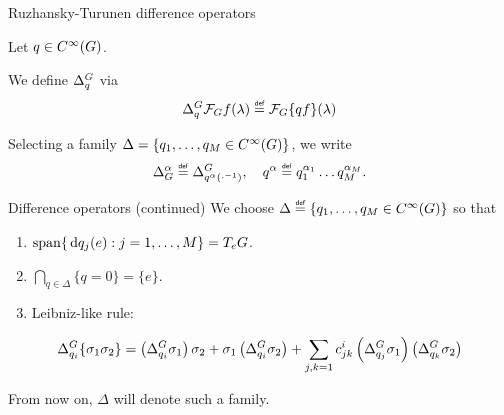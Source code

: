 \documentclass[handout]{beamer}
\begin{document}
\begin{frame}{Ruzhansky-Turunen difference operators}
    \begin{definition}
        Let $q \in {C^\infty(G)}$.

        We define ${\Delta^{G}_{q}}$ via
        \begin{align*}
            \DifferenceOperator q \Fourier f(\lambda)
            \defeq \Fourier \{q f\}(\lambda)
        \end{align*}
    \end{definition}

    \pause

    Selecting a family $\Delta = \{q_1, \dots, q_M \in {C^\infty(G)}\}$,
    we write
    \begin{align*}
        \DifferenceOperatorOrder \alpha \defeq \DifferenceOperator {q^\alpha(\dummy^{-1})},
        \quad q^\alpha \defeq q^{\alpha_1}_1 \dots q^{\alpha_M}_M.
    \end{align*}
\end{frame}

\begin{frame}{Difference operators (continued)}
    We choose $\Delta \defeq \{q_1, \dots, q_M \in \SmoothFunctions \Group\}$ so that
    \begin{enumerate}
        \item
            $\operatorname{span} \{\,\mathrm{d} q_j(e) : j = 1, \dots, M\} = T_e G$.
        \item
            $\bigcap_{q \in \Delta} \{q = 0\} = \{e\}$.
        \item
            Leibniz-like rule:
    \end{enumerate}
    \begin{align*}
        {\Delta^{G}_{q_i}} \{\sigma_1 \sigma_2\}
        =
        \left({\Delta^{G}_{q_i}} \sigma_1 \right) \sigma_2
        + \sigma_1 \left({\Delta^{G}_{q_i}} \sigma_2\right)
        + \sum_{j, k = 1} c^i_{j k} \left({\Delta^{G}_{q_j}} \sigma_1\right) \left({\Delta^{G}_{q_k}} \sigma_2\right)
    \end{align*}

    \pause

    From now on,
    $\Delta$ will denote such a family.
\end{frame}
\end{document}
